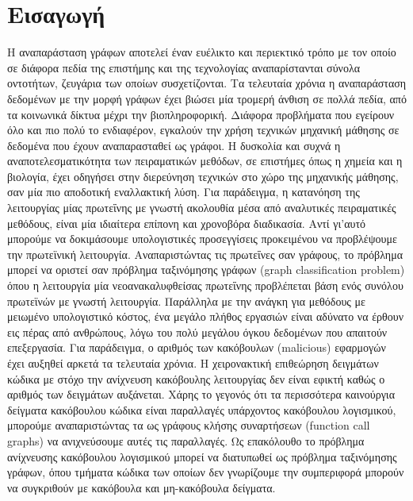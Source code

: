 \mainmatter
\chapter{Εισαγωγή}
\label{chap1}



Η αναπαράσταση γράφων αποτελεί έναν ευέλικτο και περιεκτικό τρόπο με τον οποίο σε διάφορα πεδία της επιστήμης και της τεχνολογίας αναπαρίστανται σύνολα οντοτήτων, ζευγάρια των οποίων συσχετίζονται.
Τα τελευταία χρόνια η αναπαράσταση δεδομένων με την μορφή γράφων έχει βιώσει μία τρομερή άνθιση σε πολλά πεδία, από τα κοινωνικά δίκτυα μέχρι την βιοπληροφορική.
Διάφορα προβλήματα που εγείρουν όλο και πιο πολύ το ενδιαφέρον, εγκαλούν την χρήση τεχνικών μηχανική μάθησης σε δεδομένα που έχουν αναπαρασταθεί ως γράφοι.
Η δυσκολία και συχνά η αναποτελεσματικότητα των πειραματικών μεθόδων, σε επιστήμες όπως η χημεία και η βιολογία, έχει οδηγήσει στην διερεύνηση τεχνικών στο χώρο της μηχανικής μάθησης, σαν μία πιο αποδοτική εναλλακτική λύση. Για παράδειγμα, η κατανόηση της λειτουργίας μίας πρωτεΐνης με γνωστή ακολουθία μέσα από αναλυτικές πειραματικές μεθόδους, είναι μία ιδιαίτερα επίπονη και χρονοβόρα διαδικασία.
Αντί γι'αυτό μπορούμε να δοκιμάσουμε υπολογιστικές προσεγγίσεις προκειμένου να προβλέψουμε την πρωτεϊνική λειτουργία.
Αναπαριστώντας τις πρωτεΐνες σαν γράφους, το πρόβλημα μπορεί να οριστεί σαν πρόβλημα ταξινόμησης γράφων (graph classification problem) όπου η λειτουργία μία νεοανακαλυφθείσας πρωτεΐνης προβλέπεται βάση ενός συνόλου πρωτεϊνών με γνωστή λειτουργία. 
Παράλληλα με την ανάγκη για μεθόδους με μειωμένο υπολογιστικό κόστος, ένα μεγάλο πλήθος εργασιών είναι αδύνατο να έρθουν εις πέρας από ανθρώπους, λόγω του πολύ μεγάλου όγκου δεδομένων που απαιτούν επεξεργασία.
Για παράδειγμα, ο αριθμός των κακόβουλων (malicious) εφαρμογών έχει αυξηθεί αρκετά τα τελευταία χρόνια.
Η χειρονακτική επιθεώρηση δειγμάτων κώδικα με στόχο την ανίχνευση κακόβουλης λειτουργίας δεν είναι εφικτή καθώς ο αριθμός των δειγμάτων αυξάνεται. 
Χάρης το γεγονός ότι τα περισσότερα καινούργια δείγματα κακόβουλου κώδικα είναι παραλλαγές υπάρχοντος κακόβουλου λογισμικού, μπορούμε αναπαριστώντας τα ως γράφους κλήσης συναρτήσεων (function call graphs) να ανιχνεύσουμε αυτές τις παραλλαγές.
Ως επακόλουθο το πρόβλημα ανίχνευσης κακόβουλου λογισμικού μπορεί να διατυπωθεί ως πρόβλημα ταξινόμησης γράφων, όπου τμήματα κώδικα των οποίων δεν γνωρίζουμε την συμπεριφορά μπορούν να συγκριθούν με κακόβουλα και μη-κακόβουλα δείγματα. 
